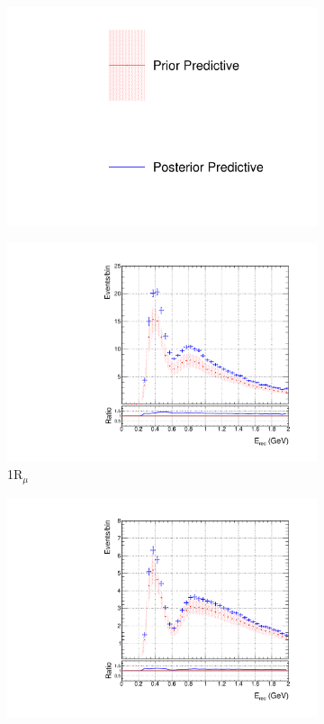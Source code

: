 \begin{figure}[!htbp]
\centering
\begin{subfigure}{.95\textwidth}
  \centering
  \includegraphics[width=0.25\linewidth]{figs/skspecleg}
\end{subfigure}
\begin{subfigure}{.49\textwidth}
  \centering
  \includegraphics[width=0.95\linewidth]{figs/skspecpolynumu}
  \caption{1R$_{\mu}$}
  \label{fig:skppnumu}
\end{subfigure}
\begin{subfigure}{.49\textwidth}
  \centering
  \includegraphics[width=0.95\linewidth]{figs/skspecpolynumubar}

\end{subfigure}
\end{figure}
